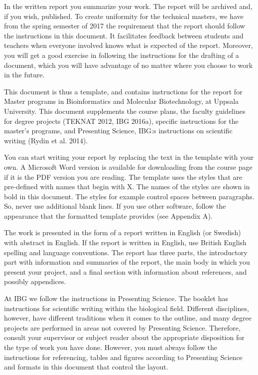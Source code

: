 \documentclass[../main.tex]{subfiles}
\begin{document}
In the written report you summarize your work. The report will be archived and, if you wish, published. To create uniformity for the technical masters, we have from the spring semester of 2017 the requirement that the report should follow the instructions in this document. It facilitates feedback between students and teachers when everyone involved knows what is expected of the report. Moreover, you will get a good exercise in following the instructions for the drafting of a document, which you will have advantage of no matter where you choose to work in the future.

This document is thus a template, and contains instructions for the report for Master programs in Bioinformatics and Molecular Biotechnology, at Uppsala University. This document supplements the course plans, the faculty guidelines for degree projects (TEKNAT 2012, IBG 2016a), specific instructions for the master's programs, and Presenting Science, IBG:s instructions on scientific writing (Rydin et al. 2014).

You can start writing your report by replacing the text in the template with your own. A Microsoft Word version is available for downloading from the course page if it is the PDF version you are reading. The template uses the styles that are pre-defined with names that begin with X. The names of the styles are shown in bold in this document. The styles for example control spaces between paragraphs. So, never use additional blank lines. If you use other software, follow the appearance that the formatted template provides (see Appendix A).

The work is presented in the form of a report written in English (or Swedish) with abstract in English. If the report is written in English, use British English spelling and language conventions. The report has three parts, the introductory part with information and summaries of the report, the main body in which you present your project, and a final section with information about references, and possibly appendices.

At IBG we follow the instructions in Presenting Science. The booklet has instructions for scientific writing within the biological field. Different disciplines, however, have different traditions when it comes to the outline, and many degree projects are performed in areas not covered by Presenting Science. Therefore, consult your supervisor or subject reader about the appropriate disposition for the type of work you have done. However, you must always follow the instructions for referencing, tables and figures according to Presenting Science and formats in this document that control the layout.
\end{document}
